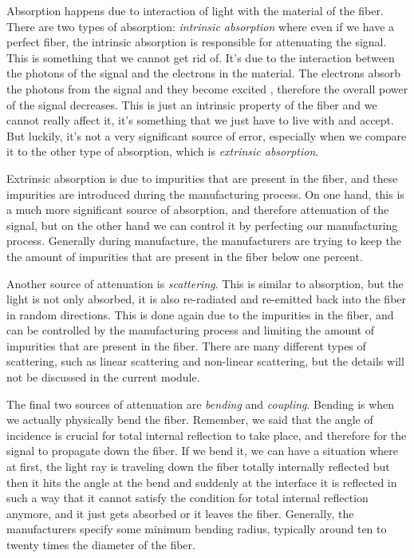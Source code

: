 Absorption happens due to interaction of light with the material of the fiber. There are two types of absorption:  \emph{intrinsic absorption} where even if we have a perfect fiber, the intrinsic absorption is responsible for attenuating the signal. This is something that we cannot get rid of. It's due to the interaction between the photons of the signal and the electrons in the material. The electrons absorb the photons from the signal and they become excited , therefore the overall  power of the signal decreases. This is just an intrinsic property of the fiber and we cannot really affect it, it's something that we just have to live with and accept. But luckily, it's not a very significant source of error, especially when we compare it to the other type of absorption, which is \emph{extrinsic absorption}.

Extrinsic absorption is due to impurities that are present in the fiber, and these impurities are introduced during the manufacturing process. On one hand, this is a much more significant source of absorption, and therefore attenuation of the signal, but on the other hand we can control it by perfecting our manufacturing process. Generally during manufacture, the manufacturers are trying to keep the the amount of impurities that are present in the fiber below one percent. 

Another source of attenuation is \emph{scattering}. This is similar to absorption, but the light is not only absorbed, it is also re-radiated and re-emitted back into the fiber in random directions. This is done again due to the impurities in the fiber, and can be controlled by the manufacturing process and limiting the amount of impurities that are present in the fiber. There are many different types of scattering, such as linear scattering and non-linear scattering, but the details will not be discussed in the current module.

The final two sources of attenuation are \emph{bending} and \emph{coupling}. Bending is when we actually physically bend the fiber. Remember, we said that the angle of incidence is crucial for total internal reflection to take place, and therefore for the signal to propagate down the fiber. If we bend it, we can have a situation where at first, the light ray is traveling down the fiber totally internally reflected but then it hits the angle at the bend and suddenly at the interface it is reflected in such a way that it cannot satisfy the condition for total internal reflection anymore, and it just gets absorbed or it leaves the fiber.  Generally, the manufacturers specify some minimum bending radius, typically around ten to twenty times the diameter of the fiber.

